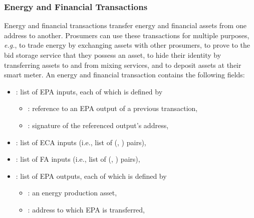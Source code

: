 \subsubsection{Energy and Financial Transactions}
Energy and financial transactions transfer energy and financial assets
from one address to another.  Prosumers can use these transactions for
multiple purposes, {\em e.g.}, to trade energy by exchanging assets
with other prosumers, to prove to the bid storage service that they
possess an asset, to hide their identity by transferring assets to and
from mixing services, and to deposit assets at their smart meter.
%
An energy and financial transaction contains the following fields:
\begin{itemize}[noitemsep,topsep=-\parskip]
\item {}: list of EPA inputs, each of which is defined by
\begin{itemize}[leftmargin=0.5em,nosep]
\item {}: reference to an EPA output of a previous transaction,
\item {}: signature of the referenced output's address,
\end{itemize}
\item {}: list of ECA inputs (i.e., list of (, ) pairs), %
\item {}: list of FA inputs (i.e., list of (, ) pairs), %
\item {}: list of EPA outputs, each of which is defined by
\begin{itemize}[leftmargin=0.5em,nosep]
\item {}: an energy production asset,
\item {}: address to which EPA is transferred,

\end{itemize}
\end{itemize}
